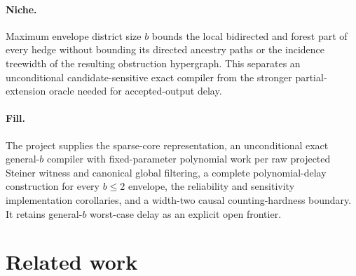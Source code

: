 \documentclass{article}
\begin{document}
\paragraph{Niche.} Maximum envelope district size \(b\) bounds the local bidirected and forest part of every hedge without bounding its directed ancestry paths or the incidence treewidth of the resulting obstruction hypergraph.  This separates an unconditional candidate-sensitive exact compiler from the stronger partial-extension oracle needed for accepted-output delay.

\paragraph{Fill.} The project supplies the sparse-core representation, an unconditional exact general-\(b\) compiler with fixed-parameter polynomial work per raw projected Steiner witness and canonical global filtering, a complete polynomial-delay construction for every \(b\le2\) envelope, the reliability and sensitivity implementation corollaries, and a width-two causal counting-hardness boundary.  It retains general-\(b\) worst-case delay as an explicit open frontier.

\section{Related work}
\end{document}
